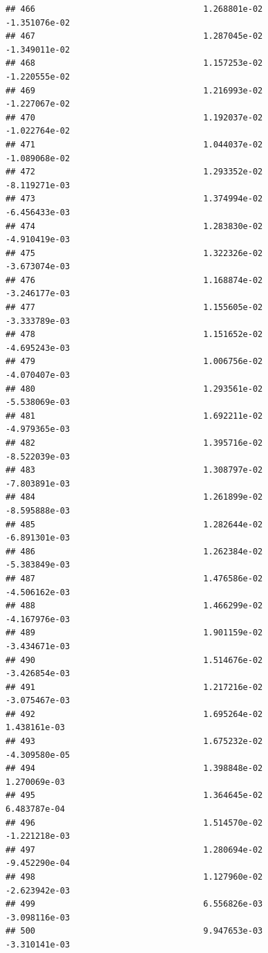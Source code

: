 \documentclass[
]{article}
\begin{document}
\begin{verbatim}
## 466                                  1.268801e-02          -1.351076e-02
## 467                                  1.287045e-02          -1.349011e-02
## 468                                  1.157253e-02          -1.220555e-02
## 469                                  1.216993e-02          -1.227067e-02
## 470                                  1.192037e-02          -1.022764e-02
## 471                                  1.044037e-02          -1.089068e-02
## 472                                  1.293352e-02          -8.119271e-03
## 473                                  1.374994e-02          -6.456433e-03
## 474                                  1.283830e-02          -4.910419e-03
## 475                                  1.322326e-02          -3.673074e-03
## 476                                  1.168874e-02          -3.246177e-03
## 477                                  1.155605e-02          -3.333789e-03
## 478                                  1.151652e-02          -4.695243e-03
## 479                                  1.006756e-02          -4.070407e-03
## 480                                  1.293561e-02          -5.538069e-03
## 481                                  1.692211e-02          -4.979365e-03
## 482                                  1.395716e-02          -8.522039e-03
## 483                                  1.308797e-02          -7.803891e-03
## 484                                  1.261899e-02          -8.595888e-03
## 485                                  1.282644e-02          -6.891301e-03
## 486                                  1.262384e-02          -5.383849e-03
## 487                                  1.476586e-02          -4.506162e-03
## 488                                  1.466299e-02          -4.167976e-03
## 489                                  1.901159e-02          -3.434671e-03
## 490                                  1.514676e-02          -3.426854e-03
## 491                                  1.217216e-02          -3.075467e-03
## 492                                  1.695264e-02           1.438161e-03
## 493                                  1.675232e-02          -4.309580e-05
## 494                                  1.398848e-02           1.270069e-03
## 495                                  1.364645e-02           6.483787e-04
## 496                                  1.514570e-02          -1.221218e-03
## 497                                  1.280694e-02          -9.452290e-04
## 498                                  1.127960e-02          -2.623942e-03
## 499                                  6.556826e-03          -3.098116e-03
## 500                                  9.947653e-03          -3.310141e-03

\end{verbatim}
\end{document}
